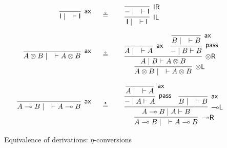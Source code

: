 \documentclass[sn-mathphys-num]{sn-jnl}%
\newcommand{\vd}{\vdash}
\newcommand{\tl}{\otimes \mathsf{L}}
\newcommand{\tr}{\otimes\mathsf{R}}
\newcommand{\pass}{\mathsf{pass}}
\newcommand{\unitl}{\mathsf{IL}}
\newcommand{\unitr}{\mathsf{IR}}
\newcommand{\ax}{\mathsf{ax}}
\newcommand{\ot}{\otimes}
\newcommand{\lolli}{\multimap}
\newcommand{\lleft}{{\lolli}\mathsf{L}}
\newcommand{\lright}{{\lolli}\mathsf{R}}
\newcommand{\unit}{\mathsf{I}}
\newcommand{\proofbox}[1]{\begin{tabular}{l} #1 \end{tabular}}
\theoremstyle{thmstyleone}%
\theoremstyle{thmstyletwo}%
\theoremstyle{thmstylethree}%
\begin{document}
\begin{figure}
  \begin{displaymath}
    \begin{array}{rcl}
      \proofbox{
      \infer[\ax]{\unit \mid \quad \vd \unit}{}
      }
      &\circeq&
      \proofbox{
      \infer[\unitl]{\unit \mid \quad \vd \unit}{
      \infer[\unitr]{{-} \mid \quad \vd \unit}{}
      }
      }
      \\[20pt]
      \proofbox{
      \infer[\ax]{A \ot B \mid \quad \vd A \ot B}{}
      }
      &\circeq&
      \proofbox{
      \infer[\tl]{A \ot B \mid \quad \vd A \ot B}{
      \infer[\tr]{A \mid B \vd A \ot B}{
      \infer[\ax]{A \mid \quad \vd A}{}
      &
      \infer[\pass]{{-} \mid B \vd B}{
      \infer[\ax]{B \mid \quad \vd B}{}
      }
      }
      }
      }
      \\[35pt]
      \proofbox{
      \infer[\ax]{A \lolli B \mid \quad \vd A \lolli B}{}
      }
      &\circeq&
      \proofbox{
      \infer[\lright]{A \lolli B \mid \quad \vd A \lolli B}{
      \infer[\lleft]{A \lolli B \mid A \vd B}{
      \infer[\pass]{{-} \mid A \vd A}{
      \infer[\ax]{A \mid \quad \vd A}{}
      }
      &
      \infer[\ax]{B \mid \quad \vd B}{}
      }
      }
      }
    \end{array}
  \end{displaymath}
  \caption{Equivalence of derivations: $\eta$-conversions}
  \label{fig:circeqeta}
\end{figure}
\end{document}
